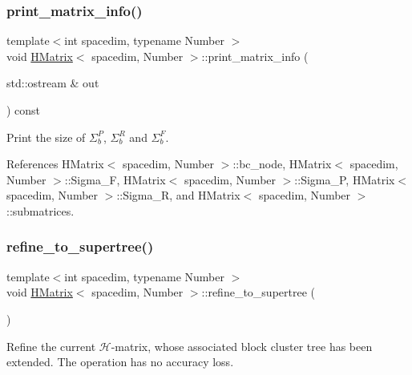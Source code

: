 \subsubsection{\texorpdfstring{print\+\_\+matrix\+\_\+info()}{print\_matrix\_info()}}
{\footnotesize\ttfamily template$<$int spacedim, typename Number $>$ \\
void \hyperlink{classHMatrix}{H\+Matrix}$<$ spacedim, Number $>$\+::print\+\_\+matrix\+\_\+info (\begin{DoxyParamCaption}\item[{std\+::ostream \&}]{out }\end{DoxyParamCaption}) const}

Print the size of $\Sigma_b^P$, $\Sigma_b^R$ and $\Sigma_b^F$.

References H\+Matrix$<$ spacedim, Number $>$\+::bc\+\_\+node, H\+Matrix$<$ spacedim, Number $>$\+::\+Sigma\+\_\+F, H\+Matrix$<$ spacedim, Number $>$\+::\+Sigma\+\_\+P, H\+Matrix$<$ spacedim, Number $>$\+::\+Sigma\+\_\+R, and H\+Matrix$<$ spacedim, Number $>$\+::submatrices.

\mbox{\label{classHMatrix_ad2b353962226c78910d6ddb6b5b8e460}} 
\subsubsection{\texorpdfstring{refine\+\_\+to\+\_\+supertree()}{refine\_to\_supertree()}}
{\footnotesize\ttfamily template$<$int spacedim, typename Number $>$ \\
void \hyperlink{classHMatrix}{H\+Matrix}$<$ spacedim, Number $>$\+::refine\+\_\+to\+\_\+supertree (\begin{DoxyParamCaption}{ }\end{DoxyParamCaption})}

Refine the current $\mathcal{H}$-\/matrix, whose associated block cluster tree has been extended. The operation has no accuracy loss.

